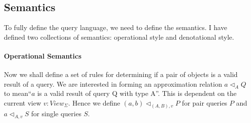 \documentclass[12pt,a4paper,twoside,openright]{report}
\newcommand{\opRule}[3]{#1 \triangleleft_{#2, v} #3}
\begin{document}
\subsection{Semantics}
   To fully define the query language, we need to define the semantics. I have defined two collections of semantics: operational style and denotational style.
\paragraph{Operational Semantics}   

Now we shall define a set of rules for determining if a pair of objects is a valid result of a query. We are interested in forming an approximation relation $a \triangleleft_A Q$ to mean``$a$ is a valid result of query Q with type A''. This is dependent on the current view $v: View_{\Sigma}$. Hence we define $\opRule{(a, b)}{(A, B)}{P}$ for pair queries $P$ and $\opRule{a}{A}{S}$ for single queries $S$.
\end{document}

